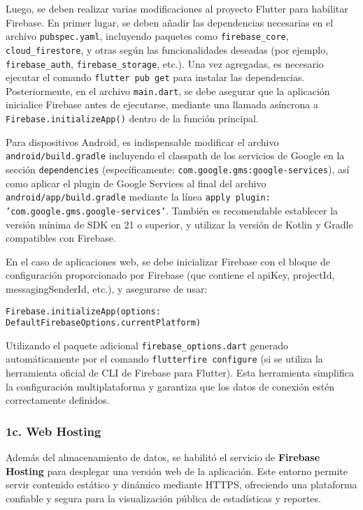 Luego, se deben realizar varias modificaciones al proyecto Flutter para habilitar Firebase. En primer lugar, se deben añadir las dependencias necesarias en el archivo \texttt{pubspec.yaml}, incluyendo paquetes como \texttt{firebase\_core}, \texttt{cloud\_firestore}, y otras según las funcionalidades deseadas (por ejemplo, \texttt{firebase\_auth}, \texttt{firebase\_storage}, etc.). Una vez agregadas, es necesario ejecutar el comando \texttt{flutter pub get} para instalar las dependencias. Posteriormente, en el archivo \texttt{main.dart}, se debe asegurar que la aplicación inicialice Firebase antes de ejecutarse, mediante una llamada asíncrona a \texttt{Firebase.initializeApp()} dentro de la función principal.

Para dispositivos Android, es indispensable modificar el archivo \texttt{android/build.gradle} incluyendo el classpath de los servicios de Google en la sección \texttt{dependencies} (específicamente: \texttt{com.google.gms:google-services}), así como aplicar el plugin de Google Services al final del archivo \texttt{android/app/build.gradle} mediante la línea \texttt{apply plugin: 'com.google.gms.google-services'}. También es recomendable establecer la versión mínima de SDK en 21 o superior, y utilizar la versión de Kotlin y Gradle compatibles con Firebase.

  En el caso de aplicaciones web, se debe inicializar Firebase con el bloque de configuración proporcionado por Firebase (que contiene el apiKey, projectId, messagingSenderId, etc.), y asegurarse de usar:
  \begin{center}
    \texttt{Firebase.initializeApp(options: DefaultFirebaseOptions.currentPlatform)}
  \end{center}
Utilizando el paquete adicional \texttt{firebase\_options.dart} generado automáticamente por el comando \texttt{flutterfire configure} (si se utiliza la herramienta oficial de CLI de Firebase para Flutter). Esta herramienta simplifica la configuración multiplataforma y garantiza que los datos de conexión estén correctamente definidos.

\subsubsection{1c. Web Hosting}
Además del almacenamiento de datos, se habilitó el servicio de \textbf{Firebase Hosting} para desplegar una versión web de la aplicación. Este entorno permite servir contenido estático y dinámico mediante HTTPS, ofreciendo una plataforma confiable y segura para la visualización pública de estadísticas y reportes.

